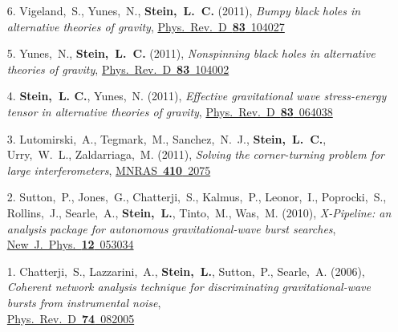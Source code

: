 \begin{enumerate}
\item[{6.}] Vigeland,~S., Yunes,~N., {\bf Stein,~L.~C.} (2011), {\it
    Bumpy black holes in alternative theories of gravity},
  \href{http://dx.doi.org/10.1103/PhysRevD.83.104027}{Phys.~Rev.~D~{\bf 83}~104027}
\item[{5.}] Yunes,~N., {\bf Stein,~L.~C.} (2011), {\it Nonspinning
    black holes in alternative theories of gravity},
  \href{http://dx.doi.org/10.1103/PhysRevD.83.104002}{Phys.~Rev.~D~{\bf 83}~104002}
\item[{4.}] {\bf Stein,~L. C.}, Yunes,~N. (2011), {\it Effective
    gravitational wave stress-energy tensor in alternative theories of
    gravity},
  \href{http://dx.doi.org/10.1103/PhysRevD.83.064038}{Phys.~Rev.~D~{\bf 83}~064038}
\item[{3.}] Lutomirski,~A., Tegmark,~M., Sanchez,~N.~J., {\bf
    Stein,~L.~C.},
  Urry,~W.~L., Zaldarriaga,~M. (2011), {\it Solving the
    corner-turning problem for large interferometers},
  \href{http://dx.doi.org/10.1111/j.1365-2966.2010.17587.x}{MNRAS~{\bf 410}~2075}
\item[{2.}] Sutton,~P., Jones,~G., Chatterji,~S., Kalmus,~P., Leonor,~I.,
  Poprocki,~S., Rollins,~J., Searle,~A., {\bf Stein,~L.}, Tinto,~M.,
  Was,~M. (2010), {\it X-Pipeline: an analysis package for autonomous
    gravitational-wave burst searches},
  \href{http://dx.doi.org/10.1088/1367-2630/12/5/053034}{New~J.~Phys.~{\bf 12}~053034}
\item[{1.}] Chatterji,~S., Lazzarini,~A., {\bf Stein,~L.}, Sutton,~P.,
  Searle,~A. (2006), {\it Coherent network analysis technique for
    discriminating gravitational-wave bursts from instrumental noise},\\
  \href{http://dx.doi.org/10.1103/PhysRevD.74.082005}{Phys.~Rev.~D~{\bf 74}~082005}
\end{enumerate}

